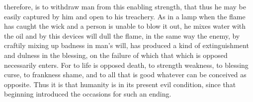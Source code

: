 therefore, is to withdraw man from this enabling strength, that thus he may be easily captured by him and open to his treachery. As in a lamp when the flame has caught the wick and a person is unable to blow it out, he mixes water with the oil and by this devices will dull the flame, in the same way the enemy, by craftily mixing up badness in man’s will, has produced a kind of extinguishment and dulness in the blessing, on the failure of which that which is opposed necessarily enters. For to life is opposed death, to strength weakness, to blessing curse, to frankness shame, and to all that is good whatever can be conceived as opposite. Thus it is that humanity is in its present evil condition, since that beginning introduced the occasions for such an ending.


